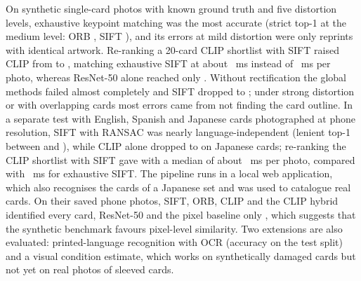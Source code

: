On synthetic single-card photos with known ground truth and five distortion levels, exhaustive keypoint matching was the most accurate (strict top-1 at the medium level: ORB , SIFT ), and its errors at mild distortion were only reprints with identical artwork. Re-ranking a 20-card CLIP shortlist with SIFT raised CLIP from  to , matching exhaustive SIFT at about ~ms instead of ~ms per photo, whereas ResNet-50 alone reached only . Without rectification the global methods failed almost completely and SIFT dropped to ; under strong distortion or with overlapping cards most errors came from not finding the card outline. In a separate test with English, Spanish and Japanese cards photographed at phone resolution, SIFT with RANSAC was nearly language-independent (lenient top-1 between  and ), while CLIP alone dropped to  on Japanese cards; re-ranking the CLIP shortlist with SIFT gave  with a median of about ~ms per photo, compared with ~ms for exhaustive SIFT. The pipeline runs in a local web application, which also recognises the  cards of a Japanese set and was used to catalogue  real cards. On their saved phone photos, SIFT, ORB, CLIP and the CLIP hybrid identified every card, ResNet-50  and the pixel baseline only , which suggests that the synthetic benchmark favours pixel-level similarity. Two extensions are also evaluated: printed-language recognition with OCR (accuracy  on the test split) and a visual condition estimate, which works on synthetically damaged cards but not yet on real photos of sleeved cards.
